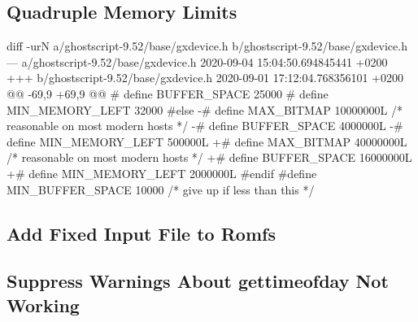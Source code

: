 \documentclass[a4paper,11pt]{article}
\begin{document}
\subsection{Quadruple Memory Limits}
\label{app:quadruple-memory-limits}

\begin{Diff}
diff -urN a/ghostscript-9.52/base/gxdevice.h b/ghostscript-9.52/base/gxdevice.h
--- a/ghostscript-9.52/base/gxdevice.h  2020-09-04 15:04:50.694845441 +0200
+++ b/ghostscript-9.52/base/gxdevice.h  2020-09-01 17:12:04.768356101 +0200
@@ -69,9 +69,9 @@
 #   define BUFFER_SPACE 25000
 #   define MIN_MEMORY_LEFT 32000
 #else
-#   define MAX_BITMAP 10000000L /* reasonable on most modern hosts */
-#   define BUFFER_SPACE 4000000L
-#   define MIN_MEMORY_LEFT 500000L
+#   define MAX_BITMAP 40000000L /* reasonable on most modern hosts */
+#   define BUFFER_SPACE 16000000L
+#   define MIN_MEMORY_LEFT 2000000L
 #endif
 #define MIN_BUFFER_SPACE 10000 /* give up if less than this */
 
\end{Diff}

\subsection{Add Fixed Input File to Romfs}
\label{app:add-fixed-input-file}


\subsection{Suppress Warnings About gettimeofday Not Working}
\label{app:suppress-gettimeofday-warnings}
\end{document}
